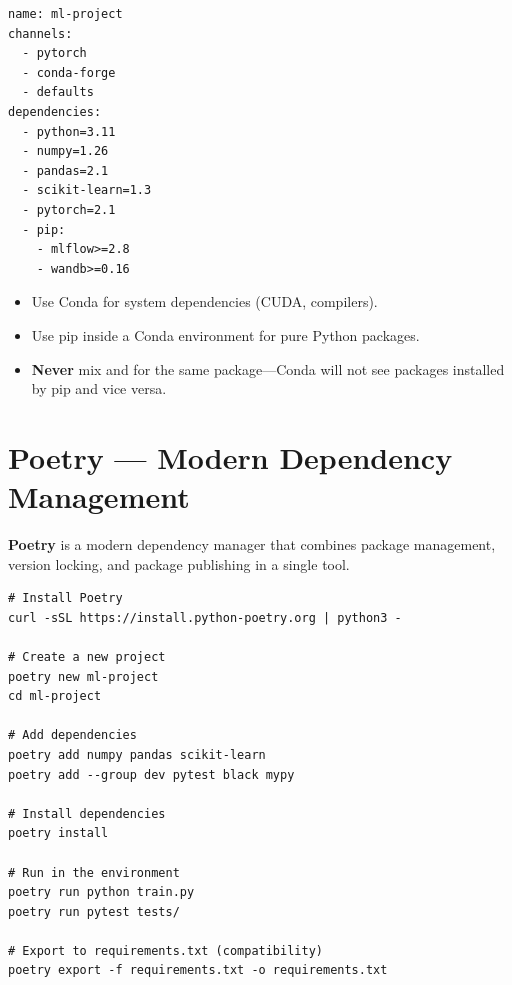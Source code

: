 \begin{codeblock}[title=\textbf{environment.yml}]
\begin{verbatim}
name: ml-project
channels:
  - pytorch
  - conda-forge
  - defaults
dependencies:
  - python=3.11
  - numpy=1.26
  - pandas=2.1
  - scikit-learn=1.3
  - pytorch=2.1
  - pip:
    - mlflow>=2.8
    - wandb>=0.16
\end{verbatim}
\end{codeblock}

\begin{bestpractice}[title=\textbf{Conda vs pip}]
\begin{itemize}
  \item Use Conda for system dependencies (CUDA, compilers).
  \item Use pip inside a Conda environment for pure Python packages.
  \item \textbf{Never} mix  and  for
    the same package---Conda will not see packages installed by pip and
    vice versa.
\end{itemize}
\end{bestpractice}

\section{Poetry --- Modern Dependency Management}
\label{sec:poetry}

\textbf{Poetry} is a modern dependency manager that combines
package management, version locking, and package publishing in a single tool.

\begin{codeblock}[title=\textbf{Poetry workflow}]
\begin{verbatim}
# Install Poetry
curl -sSL https://install.python-poetry.org | python3 -

# Create a new project
poetry new ml-project
cd ml-project

# Add dependencies
poetry add numpy pandas scikit-learn
poetry add --group dev pytest black mypy

# Install dependencies
poetry install

# Run in the environment
poetry run python train.py
poetry run pytest tests/

# Export to requirements.txt (compatibility)
poetry export -f requirements.txt -o requirements.txt
\end{verbatim}
\end{codeblock}

